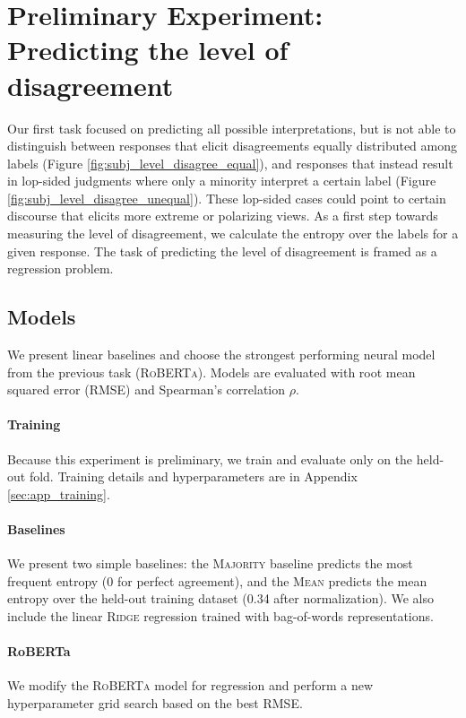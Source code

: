 \section{Preliminary Experiment: Predicting the level of disagreement}
Our first task focused on predicting all possible interpretations, but is not able to distinguish between responses that elicit disagreements equally distributed among labels (Figure \ref{fig:subj_level_disagree_equal}), and responses that instead result in lop-sided judgments where only a minority interpret a certain label (Figure \ref{fig:subj_level_disagree_unequal}). These lop-sided cases could point to certain discourse that elicits more extreme or polarizing views. As a first step towards measuring the level of disagreement, we calculate the entropy over the labels for a given response. The task of predicting the level of disagreement is framed as a regression problem.

\subsection{Models}
We present linear baselines and choose the strongest performing neural model from the previous task (\textsc{RoBERTa}). Models are evaluated with root mean squared error (RMSE) and Spearman's correlation $\rho$.

\paragraph{Training} Because this experiment is preliminary, we train and evaluate only on the held-out fold. Training details and hyperparameters are in Appendix \ref{sec:app_training}.

\paragraph{Baselines} We present two simple baselines: the \textsc{Majority} baseline predicts the most frequent entropy (0 for perfect agreement), and the \textsc{Mean} predicts the mean entropy over the held-out training dataset (0.34 after normalization). We also include the linear \textsc{Ridge} regression trained with bag-of-words representations.

\paragraph{RoBERTa} We modify the \textsc{RoBERTa} model for regression and perform a new hyperparameter grid search based on the best RMSE. 

